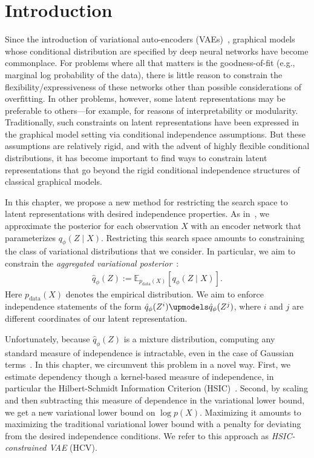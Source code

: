 \section{Introduction}

Since the introduction of variational auto-encoders (VAEs)~\cite{AEVB},
graphical models whose conditional distribution are specified by deep neural networks have become commonplace.
For problems where all that matters is the goodness-of-fit (e.g., marginal log probability of the data), there is little reason to constrain the flexibility/expressiveness of these networks other than possible considerations of overfitting. In other problems, however, some latent representations may be preferable to others---for example, for reasons of interpretability or modularity.
Traditionally, such constraints on latent representations have been expressed in the graphical model setting via conditional independence assumptions.  But these assumptions are relatively rigid, and with the advent of highly flexible conditional distributions, it has become important to find ways to constrain latent representations that go beyond the rigid conditional independence structures of classical graphical models.



In this chapter, we propose a new method for restricting the search space to latent representations
with desired independence properties.
As in~\cite{AEVB}, we approximate the posterior for each observation $X$ with an encoder network that parameterizes $q_\phi(Z \mid X)$.
Restricting this search space amounts to constraining the class of variational distributions that we consider.
In particular, we aim to constrain the \textit{aggregated variational posterior}~\cite{salakhutdinov2010efficient}:
\begin{align}
\hat{q}_\phi(Z) := \mathbb E_{p_{\text{data}}(X)} \left[ q_\phi(Z \mid X) \right].
\end{align}
Here $p_{\text{data}}(X)$ denotes the empirical distribution. 
We aim to enforce independence statements of the form $\hat{q}_\phi(Z^i) \upmodels \hat{q}_\phi(Z^j)$,
where $i$ and $j$ are different coordinates of our latent representation.

Unfortunately, because $\hat{q}_\phi(Z)$ is a mixture distribution, computing any standard measure of independence is intractable, even in the case of Gaussian terms~\cite{Durrieu2012}.
In this chapter, we circumvent this problem in a novel way. First, we estimate dependency though a kernel-based measure of independence, in particular the Hilbert-Schmidt Information Criterion (HSIC)~\cite{Gretton2005}. Second,
by scaling and then subtracting this measure of dependence in the variational lower bound, we get a new variational lower bound on $\log p(X)$.
Maximizing it amounts to maximizing the traditional variational lower bound with a penalty for deviating from the desired independence conditions.
We refer to this approach as \emph{HSIC-constrained VAE} (HCV).

